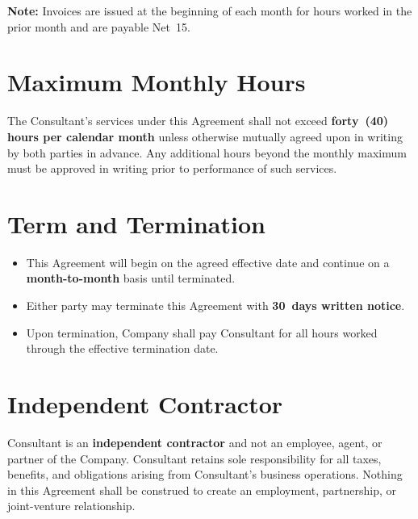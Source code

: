 \documentclass{toospoint}
\begin{document}
\begin{clausebox}
\sffamily\footnotesize\color{TPGray}
\textbf{Note:} Invoices are issued at the beginning of each month for hours
worked in the prior month and are payable Net~15.
\end{clausebox}

\section{Maximum Monthly Hours}

The Consultant's services under this Agreement shall not exceed \textbf{forty~(40)
hours per calendar month} unless otherwise mutually agreed upon in writing by both
parties in advance. Any additional hours beyond the monthly maximum must be
approved in writing prior to performance of such services.

\section{Term and Termination}

\begin{itemize}[leftmargin=1.5em, itemsep=4pt, topsep=4pt]
  \item This Agreement will begin on the agreed effective date and continue on a
        \textbf{month-to-month} basis until terminated.
  \item Either party may terminate this Agreement with \textbf{30~days written notice}.
  \item Upon termination, Company shall pay Consultant for all hours worked
        through the effective termination date.
\end{itemize}

\section{Independent Contractor}

Consultant is an \textbf{independent contractor} and not an employee, agent, or
partner of the Company. Consultant retains sole responsibility for all taxes, benefits,
and obligations arising from Consultant's business operations. Nothing in this Agreement
shall be construed to create an employment, partnership, or joint-venture relationship.
\end{document}

